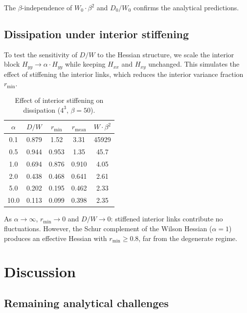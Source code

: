 \documentclass[11pt]{article}
\theoremstyle{definition}
\begin{document}
The $\beta$-independence of $W_0 \cdot \beta^2$ and $D_0/W_0$ 
confirms the analytical predictions.

\subsection{Dissipation under interior stiffening}

To test the sensitivity of $D/W$ to the Hessian structure, we scale 
the interior block $H_{yy} \to \alpha \cdot H_{yy}$ while keeping 
$H_{xx}$ and $H_{xy}$ unchanged.  This simulates the effect of 
stiffening the interior links, which reduces the interior variance 
fraction~$r_{\min}$.

\begin{table}[h]
\centering
\caption{Effect of interior stiffening on dissipation ($4^3$, $\beta = 50$).}
\label{tab:stiffness}
\begin{tabular}{ccccc}
\toprule
$\alpha$ & $D/W$ & $r_{\min}$ & $r_{\mathrm{mean}}$ & $W \cdot \beta^2$ \\
\midrule
0.1 & 0.879 & 1.52 & 3.31 & 45929 \\
0.5 & 0.944 & 0.953 & 1.35 & 45.7 \\
1.0 & 0.694 & 0.876 & 0.910 & 4.05 \\
2.0 & 0.438 & 0.468 & 0.641 & 2.61 \\
5.0 & 0.202 & 0.195 & 0.462 & 2.33 \\
10.0 & 0.113 & 0.099 & 0.398 & 2.35 \\
\bottomrule
\end{tabular}
\end{table}

As $\alpha \to \infty$, $r_{\min} \to 0$ and $D/W \to 0$: stiffened 
interior links contribute no fluctuations.  However, the Schur complement 
of the Wilson Hessian ($\alpha = 1$) produces an effective Hessian with 
$r_{\min} \geq 0.8$, far from the degenerate regime.


\section{Discussion}\label{sec:discussion}

\subsection{Remaining analytical challenges}
\end{document}
